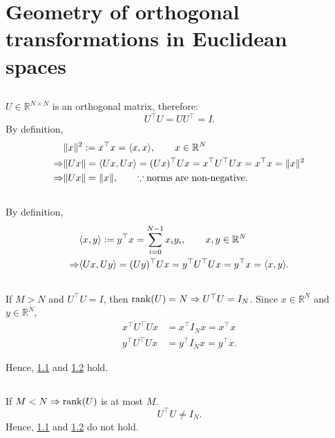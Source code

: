 \section{Geometry of orthogonal transformations in Euclidean spaces}\label{sec:part1}

\subsection{}\label{subsec:p1-i}
$U \in \mathbb{R}^{N \times N}$ is an orthogonal matrix, therefore:
\[U^\top U = U U^\top = I.\]
By definition,
\begin{align*}
	&\lVert x \rVert^2 := x^\top x = \langle x, x \rangle, \qquad x \in \mathbb{R}^N \\
	\Rightarrow & \lVert Ux \rVert = \langle Ux, Ux \rangle = (Ux)^\top Ux = x^\top U^\top U x = x^\top x = \lVert x \rVert^2 \\
	\Rightarrow & \lVert Ux \rVert = \lVert x \rVert, \qquad \because \text{norms are non-negative}.
\end{align*}


\subsection{}\label{subsec:p1-ii}
By definition, 
\begin{align*}
	& \langle x, y \rangle := y^\top x = \sum_{i=0}^{N-1} x_i y_i, \qquad x,y \in \mathbb{R}^N \\
	\Rightarrow &\langle Ux, Uy \rangle = (Uy)^\top Ux = y^\top U^\top U x = y^\top x = \langle x, y \rangle.
\end{align*}


\subsection{}
If $M > N$ and $U^\top U = I$, then $\operatorname{rank}(U) = N \Rightarrow U^\top U = I_N$. Since $x \in \mathbb{R}^N$ and $y \in \mathbb{R}^N$,
\begin{align*}
	x^\top U^\top U x &= x^\top I_N x = x^\top x \\
	y^\top U^\top U x &= y^\top I_N x = y^\top x.
\end{align*}

Hence, \ref{subsec:p1-i} and \ref{subsec:p1-ii} hold.


\subsection{}
If $M < N \Rightarrow \operatorname{rank}(U)$  is at most $M$.
\[U^\top U \neq I_N.\]
Hence, \ref{subsec:p1-i} and \ref{subsec:p1-ii} do not hold.